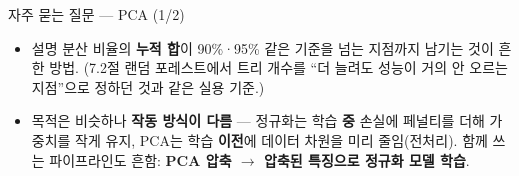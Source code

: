 \begin{frame}{자주 묻는 질문 --- PCA (1/2)}
  \small
  \begin{itemize}
    \item {}
      설명 분산 비율의 \textbf{누적 합}이 90\%·95\% 같은 기준을 넘는
      지점까지 남기는 것이 흔한 방법. \; (7.2절 랜덤 포레스트에서 트리
      개수를 ``더 늘려도 성능이 거의 안 오르는 지점''으로 정하던 것과
      같은 실용 기준.)
    \item {}
      목적은 비슷하나 \textbf{작동 방식이 다름} --- 정규화는 학습 \textbf{중}
      손실에 페널티를 더해 가중치를 작게 유지, PCA는 학습 \textbf{이전}에
      데이터 차원을 미리 줄임(전처리). \; 함께 쓰는 파이프라인도 흔함:
      \textbf{PCA 압축 $\to$ 압축된 특징으로 정규화 모델 학습}.
  \end{itemize}
\end{frame}

